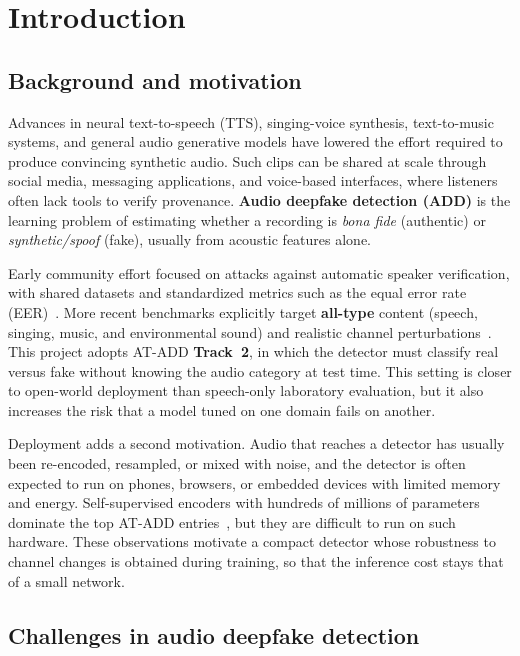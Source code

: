 \chapter{Introduction}
\label{ch:introduction}

\section{Background and motivation}

Advances in neural text-to-speech (TTS), singing-voice synthesis, text-to-music systems, and general audio generative models have lowered the effort required to produce convincing synthetic audio. Such clips can be shared at scale through social media, messaging applications, and voice-based interfaces, where listeners often lack tools to verify provenance. \textbf{Audio deepfake detection (ADD)} is the learning problem of estimating whether a recording is \emph{bona fide} (authentic) or \emph{synthetic/spoof} (fake), usually from acoustic features alone.

Early community effort focused on attacks against automatic speaker verification, with shared datasets and standardized metrics such as the equal error rate (EER)~\cite{kinnunen2017detection,wang2020asvspoof}. More recent benchmarks explicitly target \textbf{all-type} content (speech, singing, music, and environmental sound) and realistic channel perturbations~\cite{xie2026atadd}. This project adopts AT-ADD \textbf{Track~2}, in which the detector must classify real versus fake without knowing the audio category at test time. This setting is closer to open-world deployment than speech-only laboratory evaluation, but it also increases the risk that a model tuned on one domain fails on another.

Deployment adds a second motivation. Audio that reaches a detector has usually been re-encoded, resampled, or mixed with noise, and the detector is often expected to run on phones, browsers, or embedded devices with limited memory and energy. Self-supervised encoders with hundreds of millions of parameters dominate the top AT-ADD entries~\cite{xie2026atadd}, but they are difficult to run on such hardware. These observations motivate a compact detector whose robustness to channel changes is obtained during training, so that the inference cost stays that of a small network.

\section{Challenges in audio deepfake detection}

